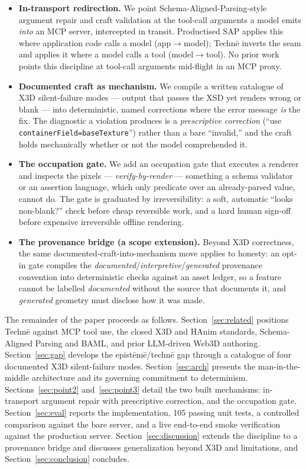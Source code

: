 \documentclass[sigconf,nonacm,screen,anonymous]{acmart}
\begin{document}
\begin{itemize}
  \item \textbf{In-transport redirection.} We point Schema-Aligned-Parsing-style argument repair and craft validation at the tool-call arguments a model emits \emph{into} an MCP server, intercepted in transit. Productised SAP applies this where application code calls a model (app$\rightarrow$model); Technē inverts the seam and applies it where a model calls a tool (model$\rightarrow$tool). No prior work points this discipline at tool-call arguments mid-flight in an MCP proxy.
  \item \textbf{Documented craft as mechanism.} We compile a written catalogue of X3D silent-failure modes --- output that passes the XSD yet renders wrong or blank --- into deterministic, named corrections where the error message \emph{is} the fix. The diagnostic a violation produces is a \emph{prescriptive correction} (``use \texttt{containerField=\textquotesingle{}baseTexture\textquotesingle{}}'') rather than a bare ``invalid,'' and the craft holds mechanically whether or not the model comprehended it.
  \item \textbf{The occupation gate.} We add an occupation gate that executes a renderer and inspects the pixels --- \emph{verify-by-render} --- something a schema validator or an assertion language, which only predicate over an already-parsed value, cannot do. The gate is graduated by irreversibility: a soft, automatic ``looks non-blank?'' check before cheap reversible work, and a hard human sign-off before expensive irreversible offline rendering.
  \item \textbf{The provenance bridge (a scope extension).} Beyond X3D correctness, the same documented-craft-into-mechanism move applies to honesty: an opt-in gate compiles the \emph{documented}/\emph{interpretive}/\emph{generated} provenance convention into deterministic checks against an asset ledger, so a feature cannot be labelled \emph{documented} without the source that documents it, and \emph{generated} geometry must disclose how it was made.
\end{itemize}

The remainder of the paper proceeds as follows. Section~\ref{sec:related} positions Technē against MCP tool use, the closed X3D and HAnim standards, Schema-Aligned Parsing and BAML, and prior LLM-driven Web3D authoring. Section~\ref{sec:gap} develops the epistēmē/technē gap through a catalogue of four documented X3D silent-failure modes. Section~\ref{sec:arch} presents the man-in-the-middle architecture and its governing commitment to determinism. Sections~\ref{sec:point2} and~\ref{sec:point3} detail the two built mechanisms: in-transport argument repair with prescriptive correction, and the occupation gate. Section~\ref{sec:eval} reports the implementation, 105 passing unit tests, a controlled comparison against the bare server, and a live end-to-end smoke verification against the production server. Section~\ref{sec:discussion} extends the discipline to a provenance bridge and discusses generalization beyond X3D and limitations, and Section~\ref{sec:conclusion} concludes.
\end{document}
